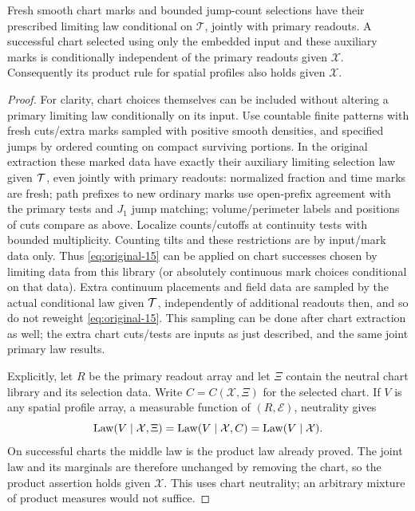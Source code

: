 \begin{lemma}\label{kern:neutral-charts}
Fresh smooth chart marks and bounded jump-count selections have their prescribed limiting law
conditional on \(\mathcal T\), jointly with primary readouts. A successful chart selected using only the embedded input and these auxiliary
marks is conditionally independent of the primary readouts given $\mathcal X$.
Consequently its product rule for spatial profiles also holds given $\mathcal X$.
\end{lemma}
\begin{proof}

For clarity, chart choices themselves can be included without altering a primary limiting law conditionally
on its input. Use countable finite patterns with fresh cuts/extra marks sampled with positive smooth
densities, and specified jumps by ordered counting on compact surviving portions. In the original extraction
these marked data have exactly their auxiliary limiting selection law given \({\cal T}\), even jointly with
primary readouts: normalized fraction and time marks are fresh; path prefixes to new ordinary marks use
open-prefix agreement with the primary tests and \(J_1\) jump matching; volume/perimeter labels and
positions of cuts compare as above. Localize counts/cutoffs at continuity tests with bounded multiplicity.
Counting tilts and these restrictions are by input/mark data only. Thus \eqref{eq:original-15} can be
applied on chart successes chosen by limiting data from this library (or absolutely continuous mark choices
conditional on that data). Extra continuum placements and field data are sampled by the actual conditional
law given \({\cal T}\), independently of additional readouts then, and so do not reweight
\eqref{eq:original-15}. This sampling can be done after chart extraction as well; the extra chart cuts/tests
are inputs as just described, and the same joint primary law results.

Explicitly, let $R$ be the primary readout array and let $\Xi$ contain the
neutral chart library and its selection data. Write $C=C(\mathcal X,\Xi)$
for the selected chart. If $V$ is any spatial profile array, a measurable
function of $(R,\mathcal E)$, neutrality gives
\[
 \operatorname{Law}(V\mid\mathcal X,\Xi)
 =\operatorname{Law}(V\mid\mathcal X,C)
 =\operatorname{Law}(V\mid\mathcal X).
\]
On successful charts the middle law is the product law already proved.
The joint law and its marginals are therefore unchanged by removing the
chart, so the product assertion holds given $\mathcal X$. This uses chart
neutrality; an arbitrary mixture of product measures would not suffice.

\end{proof}


